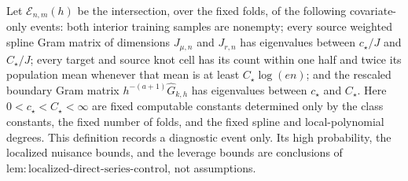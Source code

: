 Let \(\mathcal E_{n,m}(h)\) be the intersection, over the fixed folds, of the following covariate-only events: both interior training samples are nonempty; every source weighted spline Gram matrix of dimensions \(J_{\mu,n}\) and \(J_{r,n}\) has eigenvalues between \(c_\star/J\) and \(C_\star/J\); every target and source knot cell has its count within one half and twice its population mean whenever that mean is at least \(C_\star\log(en)\); and the rescaled boundary Gram matrix \(h^{-(a+1)}\widehat G_{k,h}\) has eigenvalues between \(c_\star\) and \(C_\star\).  Here \(0<c_\star<C_\star<\infty\) are fixed computable constants determined only by the class constants, the fixed number of folds, and the fixed spline and local-polynomial degrees.  This definition records a diagnostic event only.  Its high probability, the localized nuisance bounds, and the leverage bounds are conclusions of \(\mathrm{lem:localized\text{-}direct\text{-}series\text{-}control}\), not assumptions.